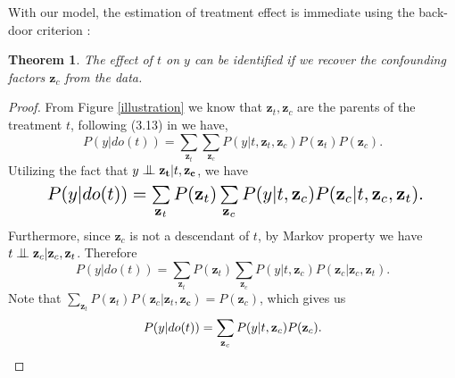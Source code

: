 \documentclass[letterpaper]{article} %
\newcommand{\bigCI}{\mathrel{\text{\scalebox{1.07}{$\perp\mkern-10mu\perp$}}}}
\newtheorem{theorem}{Theorem}
\begin{document}
With our model, the estimation of treatment effect is immediate using the back-door criterion \cite{Pearl2009}:
\begin{theorem}
The effect of $t$ on $y$ can be identified if we recover the confounding factors $\mathbf{z}_c$ from the data.
\label{ATE}
\end{theorem}
\begin{proof}
From Figure \ref{illustration} we know that $\mathbf{z}_t, \mathbf{z}_c$ are the parents of the treatment $t$, following (3.13) in \citeauthor{Pearl2009} we have,
\begin{equation}
P(y|do(t)) = \sum_{\mathbf{z}_t} \sum_{\mathbf{z}_c} P(y|t, \mathbf{z}_t,\mathbf{z}_c) P(\mathbf{z}_t)P(\mathbf{z}_c).
\end{equation}
Utilizing the fact that $y \bigCI \mathbf{z_t} |t, \mathbf{z_c}$, we have
\begin{equation}
\resizebox{0.89\hsize}{!}{
$P(y|do(t)) = \sum\limits_{\mathbf{z}_t} P(\mathbf{z}_t) \sum\limits_{\mathbf{z}_c} P(y|t, \mathbf{z}_c) P(\mathbf{z}_c | t, \mathbf{z}_c, \mathbf{z}_t).$}
\end{equation}
Furthermore, since $\mathbf{z}_c$ is not a descendant of $t$, by Markov property we have $t \bigCI \mathbf{z}_c | \mathbf{z}_c,\mathbf{z}_t$. Therefore
\begin{equation}
P(y|do(t)) = \sum\limits_{\mathbf{z}_t} P(\mathbf{z}_t) \sum\limits_{\mathbf{z}_c} P(y|t, \mathbf{z}_c) P(\mathbf{z}_c | \mathbf{z}_c, \mathbf{z}_t).
\end{equation}
Note that $\sum\limits_{\mathbf{z}_t} P(\mathbf{z}_t) P(\mathbf{z}_c|\mathbf{z}_t,\mathbf{z_c}) = P(\mathbf{z}_c)$, which gives us
\begin{equation*}
P(y|do(t)) =\sum\limits_{\mathbf{z}_c} P(y|t,\mathbf{z}_c) P(\mathbf{z}_c).  \qedhere
\end{equation*}
\end{proof}
\end{document}

